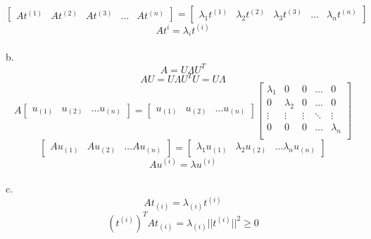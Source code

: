 \documentclass{article}
\begin{document}
\[\left[ \begin{matrix}
    At^{(1)} & At^{(2)} & At^{(3)} & \ldots & At^{(n)}
\end{matrix}\right]=\left[ \begin{matrix}
    \lambda_1t^{(1)} & \lambda_2t^{(2)} & \lambda_3t^{(3)} & \ldots & \lambda_nt^{(n)}
\end{matrix}\right]\]
\[At^{i}=\lambda_it^{(i)}\]\\
b. \[A=U\Lambda U^T\]\[AU=U\Lambda U^TU=U\Lambda\]\[
A\begin{bmatrix}
    u_{(1)} & u_{(2)} & \ldots u_{(n)}  
\end{bmatrix}=\begin{bmatrix}
    u_{(1)} & u_{(2)} & \ldots u_{(n)}  
\end{bmatrix} \begin{bmatrix}
    \lambda_{1} & 0 & 0 & \ldots & 0 \\
    0 & \lambda_{2} & 0 & \ldots & 0 \\
    \vdots & \vdots & \vdots & \ddots & \vdots  \\
    0 & 0 & 0 & \ldots & \lambda_{n} \\
\end{bmatrix}
\]
\[\begin{bmatrix}
    Au_{(1)} & Au_{(2)} & \ldots Au_{(n)}  
\end{bmatrix}=\begin{bmatrix}
    \lambda_{1} u_{(1)} & \lambda_{2}u_{(2)} & \ldots \lambda_{n}u_{(n)}  
\end{bmatrix}\]
\[Au^{(i)}=\lambda u^{(i)}\]\\
c. \[At_{(i)}=\lambda_{(i)}t^{(i)}\]
\[(t^{(i)})^TAt_{(i)}=\lambda_{(i)}||t^{(i)}||^2\geq0\]
\end{document}
